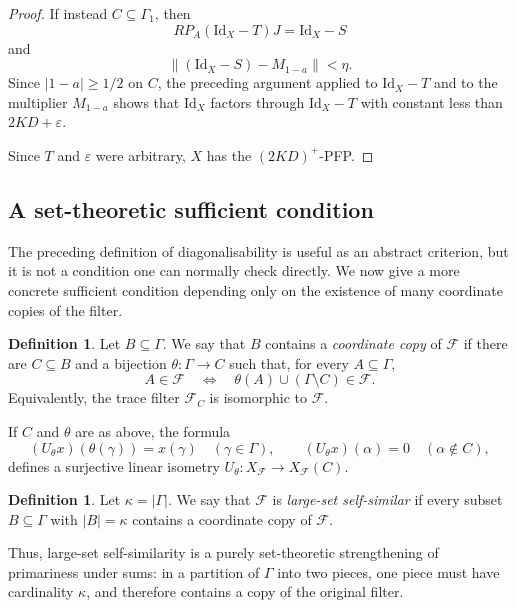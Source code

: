\documentclass[11pt]{amsart}
\theoremstyle{plain}
\theoremstyle{definition}
\newtheorem{definition}[theorem]{Definition}
\numberwithin{equation}{section}
\renewcommand{\geq}{\geqslant}
\begin{document}
\begin{proof}
If instead \(C\subseteq\Gamma_1\), then
\[
    R P_A(\mathrm{Id}_X-T)J=\mathrm{Id}_X-S
\]
and
\[
    \| (\mathrm{Id}_X-S)-M_{1-a}\|<\eta .
\]
Since \(|1-a|\geq 1/2\) on \(C\), the preceding argument applied to \(\mathrm{Id}_X-T\) and to the multiplier \(M_{1-a}\) shows that \(\mathrm{Id}_X\) factors through \(\mathrm{Id}_X-T\) with constant less than \(2KD+\varepsilon\).

Since \(T\) and \(\varepsilon\) were arbitrary, \(X\) has the \((2KD)^+\)-PFP.
\end{proof}

\subsection{A set-theoretic sufficient condition}

The preceding definition of diagonalisability is useful as an abstract criterion, but it is not a condition one can normally check directly. We now give a more concrete sufficient condition depending only on the existence of many coordinate copies of the filter.

\begin{definition}\label{def:filter-copy}
Let \(B\subseteq\Gamma\). We say that \(B\) contains a
\emph{coordinate copy} of \(\mathcal F\) if there are \(C\subseteq B\) and a bijection \(\theta\colon\Gamma\to C\) such that, for every \(A\subseteq\Gamma\),
\[
    A\in\mathcal F
    \quad\Longleftrightarrow\quad
    \theta(A)\cup(\Gamma\setminus C)\in\mathcal F .
\]
Equivalently, the trace filter \(\mathcal F_C\) is isomorphic to \(\mathcal F\).
\end{definition}

If \(C\) and \(\theta\) are as above, the formula
\[
    (U_\theta x)(\theta(\gamma))=x(\gamma)
    \quad(\gamma\in\Gamma),
    \qquad
    (U_\theta x)(\alpha)=0
    \quad(\alpha\notin C),
\]
defines a surjective linear isometry
\(
    U_\theta\colon X_{\mathcal F}\longrightarrow X_{\mathcal F}(C).
\)

\begin{definition}\label{def:large-set-self-similar-filter}
Let \(\kappa=|\Gamma|\).  We say that \(\mathcal F\) is
\emph{large-set self-similar} if every subset \(B\subseteq\Gamma\) with \(|B|=\kappa\) contains a coordinate copy of \(\mathcal F\).
\end{definition}

Thus, large-set self-similarity is a purely set-theoretic strengthening of primariness under sums: in a partition of \(\Gamma\) into two pieces, one piece must have cardinality \(\kappa\), and therefore contains a copy of the original filter.
\end{document}
